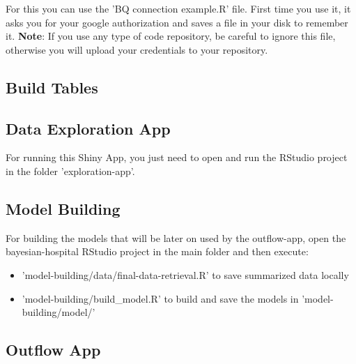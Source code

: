 \documentclass[12pt]{article}
\begin{document}
For this you can use the 'BQ connection example.R' file. First time you use it, it asks you for your google authorization and saves a file in your disk to remember it. \textbf{Note}: If you use any type of code repository, be careful to ignore this file, otherwise you will upload your credentials to your repository.

\subsection*{Build Tables}



\subsection*{Data Exploration App}

For running this Shiny App, you just need to open and run the RStudio project in the folder 'exploration-app'.

\subsection*{Model Building}

For building the models that will be later on used by the outflow-app, open the bayesian-hospital RStudio project in the main folder and then execute:

\begin{itemize}
	\item 'model-building/data/final-data-retrieval.R' to save summarized data locally 
	\item 'model-building/build\_model.R' to build and save the models in 'model-building/model/'
\end{itemize} 


\subsection*{Outflow App}

\end{document}
